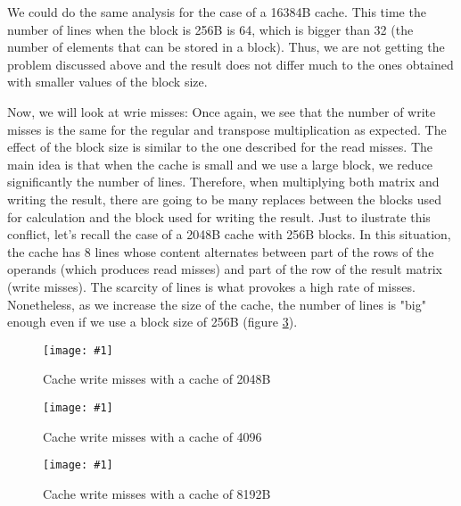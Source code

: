 \documentclass{article}
\newcommand{\myFigure}[4]{%
    \begin{figure}[!ht]
        \texttt{[image: \#1]}
        \centering
        \caption{#2}
        \label{#3}
    \end{figure}
}
\begin{document}
We could do the same analysis for the case of a 16384B cache. 
This time the number of lines when the block is 256B is 64, which is bigger than 32 (the number of elements that can be stored in a block).
Thus, we are not getting the problem discussed above and the result does not differ much to the ones obtained with smaller values of the block size.

\pagebreak

Now, we will look at wrie misses:
Once again, we see that the number of write misses is the same for the regular and transpose multiplication as expected. The effect of the block size is similar to the one described for the read misses. The main idea is that when the cache is small and we use a large block, we reduce significantly the number of lines. Therefore, when multiplying both matrix and writing the result, there are going to be many replaces between the blocks used for calculation and the block used for writing the result. Just to ilustrate this conflict, let's recall the case of a 2048B cache with 256B blocks. In this situation, the cache has 8 lines whose content alternates between part of the rows of the operands (which produces read misses) and part of the row of the result matrix (write misses). The scarcity of lines is what provokes a high rate of misses. Nonetheless, as we increase the size of the cache, the number of lines is "big" enough even if we use a block size of 256B (figure \ref{block_8192B_esc}). 


\myFigure{../material_P3/protect_out4/BlockSize_2048/cache_escritura.png}{Cache write misses with a cache of 2048B}{block_2048_esc}{0.52}


\myFigure{../material_P3/protect_out4/BlockSize_4096/cache_escritura.png}{Cache write misses with a cache of 4096}{block_4096_esc}{0.52}

\myFigure{../material_P3/protect_out4/BlockSize_8192/cache_escritura.png}{Cache write misses with a cache of 8192B}{block_8192B_esc}{0.52}

\end{document}
